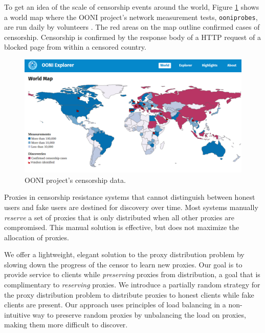 To get an idea of the scale of censorship events around the world, Figure \ref{fig:oonimap} shows a world map where the \ac{OONI} project's network measurement tests, \texttt{ooniprobes}, are run daily by volunteers \cite{OONI:2019}. The red areas on the map outline confirmed cases of censorship. Censorship is confirmed by the response body of a \ac{HTTP} request of a blocked page from within a censored country.

\begin{figure}[h!]
\centering
     \includegraphics[width=1.0\textwidth]{fig/ooni_map.png}
    \caption{\ac{OONI} project's censorship data.}
    
    \label{fig:oonimap}
\end{figure}

Proxies in censorship resistance systems that cannot distinguish between honest users and fake users are destined for discovery over time. Most systems manually \textit{reserve} a set of proxies that is only distributed when all other proxies are compromised. This manual solution is effective, but does not maximize the allocation of proxies. 

We offer a lightweight, elegant solution to the proxy distribution problem by slowing down the progress of the censor to learn new proxies. Our goal is to provide service to clients while \textit{preserving} proxies from distribution, a goal that is complimentary to \textit{reserving} proxies. We introduce a partially random strategy for the proxy distribution problem to distribute proxies to honest clients while fake clients are present. Our approach uses principles of load balancing in a non-intuitive way to preserve random proxies by unbalancing the load on proxies, making them more difficult to discover. 

